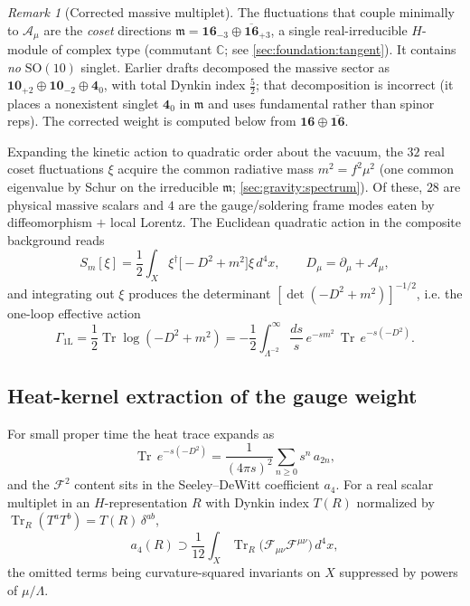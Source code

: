 \documentclass[11pt]{article}
\theoremstyle{plain}
\theoremstyle{definition}
\theoremstyle{remark}
\newtheorem{remark}[theorem]{Remark}
\newcommand{\SO}[1]{\mathrm{SO}(#1)}
\newcommand{\Tr}{\operatorname{Tr}}
\newcommand{\SOTen}{\SO{10}}
\begin{document}
\begin{remark}[Corrected massive multiplet]\label{rem:app-ym:multiplet}
The fluctuations that couple minimally to $\mathcal A_{\mu}$ are the
\emph{coset} directions $\mathfrak m=\mathbf{16}_{-3}\oplus
\overline{\mathbf{16}}_{+3}$, a single real-irreducible $H$-module of
complex type (commutant $\mathbb C$; see
\autoref{sec:foundation:tangent}). It contains \emph{no} $\SOTen$
singlet. Earlier drafts decomposed the massive sector as
$\mathbf{10}_{+2}\oplus\mathbf{10}_{-2}\oplus\mathbf 4_{0}$, with total
Dynkin index $\tfrac52$; that decomposition is incorrect (it places a
nonexistent singlet $\mathbf 4_{0}$ in $\mathfrak m$ and uses
fundamental rather than spinor reps). The corrected weight is computed
below from $\mathbf{16}\oplus\overline{\mathbf{16}}$.
\end{remark}

Expanding the kinetic action to quadratic order about the vacuum, the
$32$ real coset fluctuations $\xi$ acquire the common radiative mass
$m^{2}=f^{2}\mu^{2}$ (one common eigenvalue by Schur on the irreducible
$\mathfrak m$; \autoref{sec:gravity:spectrum}). Of these, $28$ are
physical massive scalars and $4$ are the gauge/soldering frame modes
eaten by diffeomorphism $+$ local Lorentz. The Euclidean quadratic
action in the composite background reads
\begin{equation}\label{eq:app-ym:Squad}
  S_{m}[\xi]
  =\frac12\int_{X}\xi^{\dagger}\bigl[-D^{2}+m^{2}\bigr]\xi\,d^{4}x,
  \qquad
  D_{\mu}=\partial_{\mu}+\mathcal A_{\mu},
\end{equation}
and integrating out $\xi$ produces the determinant
$[\det(-D^{2}+m^{2})]^{-1/2}$, i.e. the one-loop effective action
\begin{equation}\label{eq:app-ym:W}
  \Gamma_{\mathrm{1L}}
  =\frac12\Tr\log(-D^{2}+m^{2})
  =-\frac12\int_{\Lambda^{-2}}^{\infty}\frac{ds}{s}\,
    e^{-sm^{2}}\,\Tr\,e^{-s(-D^{2})}.
\end{equation}

\subsection{Heat-kernel extraction of the gauge weight}
\label{sec:app-ym:heatkernel}

For small proper time the heat trace expands as
\begin{equation}\label{eq:app-ym:HK}
  \Tr\,e^{-s(-D^{2})}
  =\frac{1}{(4\pi s)^{2}}\sum_{n\ge0}s^{n}\,a_{2n},
\end{equation}
and the $\mathcal F^{2}$ content sits in the Seeley--DeWitt coefficient
$a_{4}$. For a real scalar multiplet in an $H$-representation $R$ with
Dynkin index $T(R)$ normalized by
$\Tr_{R}(T^{a}T^{b})=T(R)\,\delta^{ab}$,
\begin{equation}\label{eq:app-ym:a4}
  a_{4}(R)\supset
  \frac{1}{12}\int_{X}\Tr_{R}\bigl(\mathcal F_{\mu\nu}
  \mathcal F^{\mu\nu}\bigr)\,d^{4}x ,
\end{equation}
the omitted terms being curvature-squared invariants on $X$ suppressed
by powers of $\mu/\Lambda$.
\end{document}

